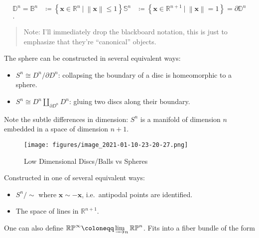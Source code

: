 \begin{example}

\begin{align*}
{\mathbb{D}}^n = \mathbb{B}^n &\coloneqq\left\{{ \mathbf{x} \in {\mathbb{R}}^{n} {~\mathrel{\Big|}~}{\left\lVert {\mathbf{x}} \right\rVert} \leq 1}\right\}
{\mathbb{S}}^n &\coloneqq\left\{{ \mathbf{x} \in {\mathbb{R}}^{n+1} {~\mathrel{\Big|}~}{\left\lVert {\mathbf{x}} \right\rVert} = 1}\right\} = {{\partial}}{\mathbb{D}}^n \\
.\end{align*}

\begin{quote}
Note: I'll immediately drop the blackboard notation, this is just to
emphasize that they're ``canonical'' objects.
\end{quote}

The sphere can be constructed in several equivalent ways:

\begin{itemize}
\tightlist
\item
  \(S^n \cong D^n / {{\partial}}D^n\): collapsing the boundary of a disc
  is homeomorphic to a sphere.
\item
  \(S^n \cong D^n \displaystyle\coprod_{{{\partial}}D^n} D^n\): gluing
  two discs along their boundary.
\end{itemize}

Note the subtle differences in dimension: \(S^n\) is a manifold of
dimension \(n\) embedded in a space of dimension \(n+1\).

\begin{figure}
\centering
\texttt{[image: figures/image\_2021-01-10-23-20-27.png]}
\caption{Low Dimensional Discs/Balls vs Spheres}
\end{figure}

\end{example}

\begin{example}

Constructed in one of several equivalent ways:

\begin{itemize}
\tightlist
\item
  \(S^n/\sim\) where \(\mathbf{x} \sim -\mathbf{x}\), i.e.~antipodal
  points are identified.
\item
  The space of lines in \({\mathbb{R}}^{n+1}\).
\end{itemize}

One can also define
\({\mathbb{RP}}^ \infty \coloneqq\varinjlim_{n} {\mathbb{RP}}^n\). Fits
into a fiber bundle of the form

\begin{center}
\end{center}

\end{example}

